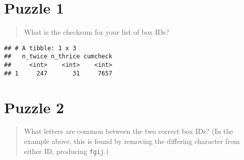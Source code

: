 \documentclass[]{book}
\newenvironment{Shaded}{\begin{snugshade}}{\end{snugshade}}
\newcommand{\KeywordTok}[1]{\textcolor[rgb]{0.13,0.29,0.53}{\textbf{#1}}}
\newcommand{\DataTypeTok}[1]{\textcolor[rgb]{0.13,0.29,0.53}{#1}}
\newcommand{\DecValTok}[1]{\textcolor[rgb]{0.00,0.00,0.81}{#1}}
\newcommand{\StringTok}[1]{\textcolor[rgb]{0.31,0.60,0.02}{#1}}
\newcommand{\ControlFlowTok}[1]{\textcolor[rgb]{0.13,0.29,0.53}{\textbf{#1}}}
\newcommand{\OperatorTok}[1]{\textcolor[rgb]{0.81,0.36,0.00}{\textbf{#1}}}
\newcommand{\NormalTok}[1]{#1}
\theoremstyle{definition}
\theoremstyle{definition}
\theoremstyle{definition}
\theoremstyle{remark}
\begin{document}
\section{Puzzle 1}\label{puzzle-1-1}

\begin{quote}
What is the checksum for your list of box IDs?
\end{quote}

\begin{Shaded}
\end{Shaded}

\begin{verbatim}
## # A tibble: 1 x 3
##   n_twice n_thrice cumcheck
##     <int>    <int>    <int>
## 1     247       31     7657
\end{verbatim}

\section{Puzzle 2}\label{puzzle-2-1}

\begin{quote}
What letters are common between the two correct box IDs? (In the example
above, this is found by removing the differing character from either ID,
producing \texttt{fgij}.)
\end{quote}
\end{document}
